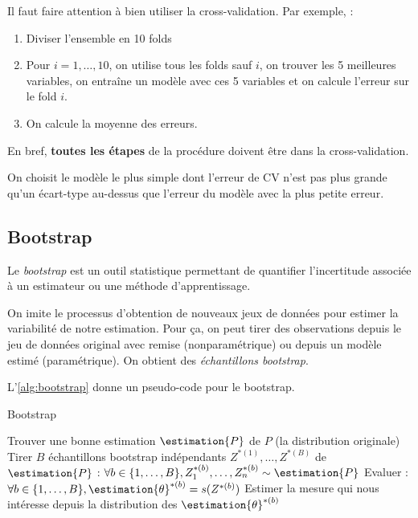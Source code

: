         Il faut faire attention à bien utiliser la cross-validation. Par exemple, :
        \begin{enumerate}
            \item Diviser l'ensemble en 10 folds
            \item Pour \(i = 1, \dots, 10\), on utilise tous les folds sauf \(i\), on trouver les 5 meilleures variables, on entraîne un modèle avec ces 5 variables et on calcule l'erreur sur le fold \(i\).
            \item On calcule la moyenne des erreurs.
        \end{enumerate}
        En bref, \textbf{toutes les étapes} de la procédure doivent être dans la cross-validation.

        On choisit le modèle le plus simple dont l'erreur de CV n'est pas plus grande qu'un écart-type au-dessus que l'erreur du modèle avec la plus petite erreur.

    \subsection{Bootstrap}
        \begin{definition}
            Le \textit{bootstrap} est un outil statistique permettant de quantifier l'incertitude associée à un estimateur ou une méthode d'apprentissage.

            On imite le processus d'obtention de nouveaux jeux de données pour estimer la variabilité de notre estimation. Pour ça, on peut tirer des observations depuis le jeu de données original avec remise (nonparamétrique) ou depuis un modèle estimé (paramétrique). On obtient des \textit{échantillons bootstrap}.

            L'\cref{alg:bootstrap} donne un pseudo-code pour le bootstrap.
        \end{definition}

        \begin{algorithm}
            \caption{Bootstrap}
            \label{alg:bootstrap}
            \begin{algorithmic}[1]
                \State Trouver une bonne estimation \(\estimation{P}\) de \(P\) (la distribution originale)
                \State Tirer \(B\) échantillons bootstrap indépendants \(Z^{*(1)}, \dots, Z^{*(B)}\) de \(\estimation{P}\) : \(\forall b \in \{1, \dots, B\}, Z_1^{*(b)}, \dots, Z_n^{*(b)} \sim \estimation{P}\)
                \State Evaluer : \(\forall b \in \{1, \dots, B\}, \estimation{\theta}^{*(b)} = s(Z^{*(b)})\)
                \State Estimer la mesure qui nous intéresse depuis la distribution des \(\estimation{\theta}^{*(b)}\)
            \end{algorithmic}
        \end{algorithm}

